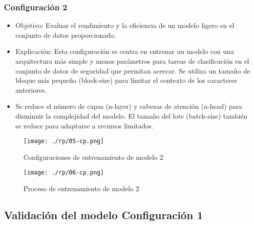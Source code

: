 \subsubsection{Configuración 2}\label{section:Configuración de los parámetros del código} 
    \begin{itemize}
        \item   Objetivo: Evaluar el rendimiento y la eficiencia de un modelo ligero en el conjunto de datos proporcionado.
        \item   Explicación: Esta configuración se centra en entrenar un modelo con una arquitectura más simple y menos parámetros para tareas de clasificación en el conjunto de datos de seguridad que permitan acercar. Se utiliza un tamaño de bloque más pequeño (block-size) para limitar el contexto de los caracteres anteriores. 
        \item   Se reduce el número de capas (n-layer) y cabezas de atención (n-head) para disminuir la complejidad del modelo. El tamaño del lote (batch-size) también se reduce para adaptarse a recursos limitados.
    \end{itemize}
\begin{figure}[H]
   \centering %
       \texttt{[image: ./rp/05-cp.png]} 
   \caption{Configuraciones de entrenamiento de modelo 2  \cite{}}
  \label{figure:Resultado 1}  %
\end{figure}
\begin{figure}[H]
   \centering %
       \texttt{[image: ./rp/06-cp.png]} 
   \caption{Proceso de entrenamiento de modelo 2\cite{}}
  \label{figure:Resultado 1}  %
\end{figure}
\subsection{Validación del modelo Configuración 1}\label{section:Adaptación de modelo nanoGPT}
